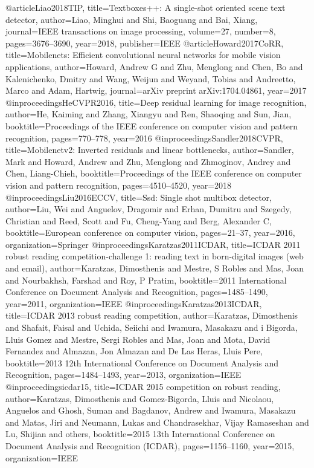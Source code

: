 @article{Liao2018TIP,
  title={Textboxes++: A single-shot oriented scene text detector},
  author={Liao, Minghui and Shi, Baoguang and Bai, Xiang},
  journal={IEEE transactions on image processing},
  volume={27},
  number={8},
  pages={3676--3690},
  year={2018},
  publisher={IEEE}
}
@article{Howard2017CoRR,
  title={Mobilenets: Efficient convolutional neural networks for mobile vision applications},
  author={Howard, Andrew G and Zhu, Menglong and Chen, Bo and Kalenichenko, Dmitry and Wang, Weijun and Weyand, Tobias and Andreetto, Marco and Adam, Hartwig},
  journal={arXiv preprint arXiv:1704.04861},
  year={2017}
}
@inproceedings{HeCVPR2016,
  title={Deep residual learning for image recognition},
  author={He, Kaiming and Zhang, Xiangyu and Ren, Shaoqing and Sun, Jian},
  booktitle={Proceedings of the IEEE conference on computer vision and pattern recognition},
  pages={770--778},
  year={2016}
}
@inproceedings{Sandler2018CVPR,
  title={Mobilenetv2: Inverted residuals and linear bottlenecks},
  author={Sandler, Mark and Howard, Andrew and Zhu, Menglong and Zhmoginov, Andrey and Chen, Liang-Chieh},
  booktitle={Proceedings of the IEEE conference on computer vision and pattern recognition},
  pages={4510--4520},
  year={2018}
}
@inproceedings{Liu2016ECCV,
  title={Ssd: Single shot multibox detector},
  author={Liu, Wei and Anguelov, Dragomir and Erhan, Dumitru and Szegedy, Christian and Reed, Scott and Fu, Cheng-Yang and Berg, Alexander C},
  booktitle={European conference on computer vision},
  pages={21--37},
  year={2016},
  organization={Springer}
}
@inproceedings{Karatzas2011ICDAR,
  title={ICDAR 2011 robust reading competition-challenge 1: reading text in born-digital images (web and email)},
  author={Karatzas, Dimosthenis and Mestre, S Robles and Mas, Joan and Nourbakhsh, Farshad and Roy, P Pratim},
  booktitle={2011 International Conference on Document Analysis and Recognition},
  pages={1485--1490},
  year={2011},
  organization={IEEE}
}
@inproceedings{Karatzas2013ICDAR,
  title={ICDAR 2013 robust reading competition},
  author={Karatzas, Dimosthenis and Shafait, Faisal and Uchida, Seiichi and Iwamura, Masakazu and i Bigorda, Lluis Gomez and Mestre, Sergi Robles and Mas, Joan and Mota, David Fernandez and Almazan, Jon Almazan and De Las Heras, Lluis Pere},
  booktitle={2013 12th International Conference on Document Analysis and Recognition},
  pages={1484--1493},
  year={2013},
  organization={IEEE}
}
@inproceedings{icdar15,
  title={ICDAR 2015 competition on robust reading},
  author={Karatzas, Dimosthenis and Gomez-Bigorda, Lluis and Nicolaou, Anguelos and Ghosh, Suman and Bagdanov, Andrew and Iwamura, Masakazu and Matas, Jiri and Neumann, Lukas and Chandrasekhar, Vijay Ramaseshan and Lu, Shijian and others},
  booktitle={2015 13th International Conference on Document Analysis and Recognition (ICDAR)},
  pages={1156--1160},
  year={2015},
  organization={IEEE}
}
